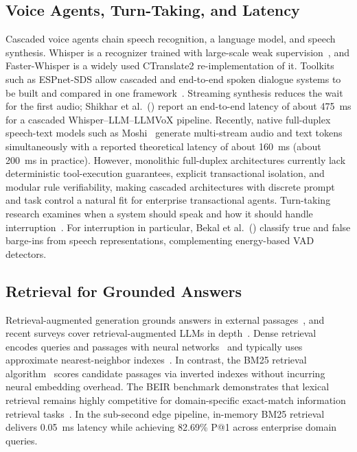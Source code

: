 \documentclass[review,12pt,times,authoryear]{elsarticle}
\theoremstyle{definition}
\begin{document}
\subsection{Voice Agents, Turn-Taking, and Latency}
Cascaded voice agents chain speech recognition, a language model, and speech synthesis. Whisper is a recognizer trained with large-scale weak supervision~\citep{Radford2023}, and Faster-Whisper is a widely used CTranslate2 re-implementation of it. Toolkits such as ESPnet-SDS allow cascaded and end-to-end spoken dialogue systems to be built and compared in one framework~\citep{Arora2025}. Streaming synthesis reduces the wait for the first audio; Shikhar et al.~(\citeyear{Shikhar2025}) report an end-to-end latency of about \SI{475}{\milli\second} for a cascaded Whisper--LLM--LLMVoX pipeline. Recently, native full-duplex speech-text models such as Moshi~\citep{Defossez2024} generate multi-stream audio and text tokens simultaneously with a reported theoretical latency of about \SI{160}{\milli\second} (about \SI{200}{\milli\second} in practice). However, monolithic full-duplex architectures currently lack deterministic tool-execution guarantees, explicit transactional isolation, and modular rule verifiability, making cascaded architectures with discrete prompt and task control a natural fit for enterprise transactional agents. Turn-taking research examines when a system should speak and how it should handle interruption~\citep{Skantze2021,Castillo2025}. For interruption in particular, Bekal et al.~(\citeyear{Bekal2022}) classify true and false barge-ins from speech representations, complementing energy-based VAD detectors.

\subsection{Retrieval for Grounded Answers}
Retrieval-augmented generation grounds answers in external passages~\citep{Lewis2020}, and recent surveys cover retrieval-augmented LLMs in depth~\citep{Fan2024}. Dense retrieval encodes queries and passages with neural networks~\citep{Karpukhin2020} and typically uses approximate nearest-neighbor indexes~\citep{Malkov2020,Johnson2021}. In contrast, the BM25 retrieval algorithm~\citep{Robertson2009} scores candidate passages via inverted indexes without incurring neural embedding overhead. The BEIR benchmark demonstrates that lexical retrieval remains highly competitive for domain-specific exact-match information retrieval tasks~\citep{Thakur2021}. In the sub-second edge pipeline, in-memory BM25 retrieval delivers \SI{0.05}{\milli\second} latency while achieving 82.69\% P@1 across enterprise domain queries.
\end{document}
